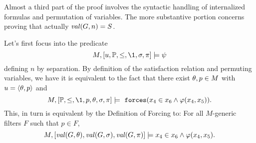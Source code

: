 Almost a third part of the proof involves the syntactic handling of
internalized formulas and permutation of variables. The more
substantive portion concerns proving that actually $\operatorname{\mathit{val}}(G,n)=S$.

Let's first focus into the predicate 
\[
M,[u,\PP,\leq,\1,\sig,\pi]\models \psi
\]
defining $n$ by separation. By definition of the satisfaction
relation and permuting variables, we have it is equivalent to the fact
that there exist $\theta,p\in M$ with   $u=\langle\theta,p\rangle$  and 
\[
M,[\PP,\leq,\1,p,\th,\sig,\pi]\models \forceisa(x_4\in
x_6\y\phi(x_4,x_5)). 
\]
This, in turn is equivalent by the Definition of Forcing to: For all $M$-generic
filters $F$ such that $p\in F$, 
\[
M,[\operatorname{\mathit{val}}(G,\theta),\operatorname{\mathit{val}}(G,\sigma),\operatorname{\mathit{val}}(G,\pi)]\models x_4\in
x_6\wedge\varphi(x_4,x_5). 
\] 



